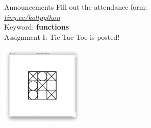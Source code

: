         \begin{frame}{Announcements}
            \LARGE
            Fill out the attendance form:\\
            \href{https://tiny.cc/koltpython}{\underline{\textit{tiny.cc/koltpython}}}\\
            Keyword: \textbf{functions}\\
            \pause
            Assignment I: Tic-Tac-Toe is posted!
            
            \begin{center}
                \includegraphics[width=0.3\textwidth]{images/end_game_figure.png}
            \end{center}
        
        \end{frame}
